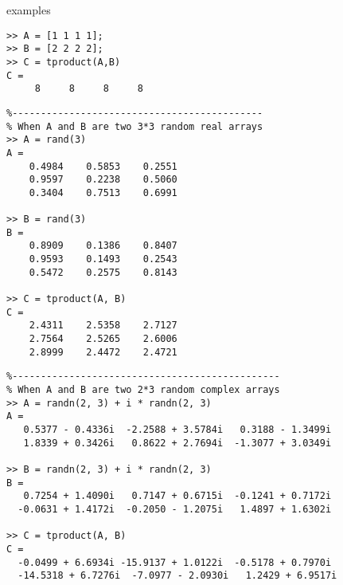 \documentclass[12pt,reqno]{amsart}
\numberwithin{equation}{section}
\numberwithin{figure}{section}
\numberwithin{table}{section}
\theoremstyle{definition}
\begin{document}

\noindent
{\color{red} \sc examples}

\begin{verbatim}
>> A = [1 1 1 1];
>> B = [2 2 2 2];
>> C = tproduct(A,B)
C =
     8     8     8     8

\end{verbatim}

\begin{verbatim}
%--------------------------------------------
% When A and B are two 3*3 random real arrays 
>> A = rand(3)
A =
    0.4984    0.5853    0.2551
    0.9597    0.2238    0.5060
    0.3404    0.7513    0.6991

>> B = rand(3)
B =
    0.8909    0.1386    0.8407
    0.9593    0.1493    0.2543
    0.5472    0.2575    0.8143
    
>> C = tproduct(A, B)
C =
    2.4311    2.5358    2.7127
    2.7564    2.5265    2.6006
    2.8999    2.4472    2.4721
\end{verbatim}

\begin{verbatim}
%-----------------------------------------------
% When A and B are two 2*3 random complex arrays
>> A = randn(2, 3) + i * randn(2, 3)
A =
   0.5377 - 0.4336i  -2.2588 + 3.5784i   0.3188 - 1.3499i
   1.8339 + 0.3426i   0.8622 + 2.7694i  -1.3077 + 3.0349i

>> B = randn(2, 3) + i * randn(2, 3)
B =
   0.7254 + 1.4090i   0.7147 + 0.6715i  -0.1241 + 0.7172i
  -0.0631 + 1.4172i  -0.2050 - 1.2075i   1.4897 + 1.6302i

>> C = tproduct(A, B)
C =
  -0.0499 + 6.6934i -15.9137 + 1.0122i  -0.5178 + 0.7970i
  -14.5318 + 6.7276i  -7.0977 - 2.0930i   1.2429 + 6.9517i
\end{verbatim}
\end{document}
